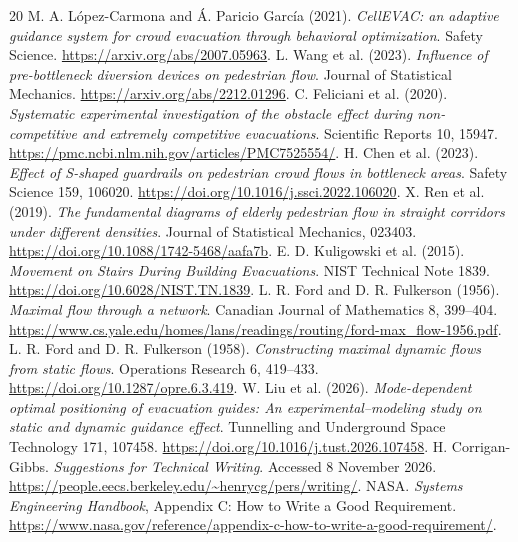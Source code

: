 \documentclass[11pt,a4paper]{article}
\begin{document}
\begin{thebibliography}{20}
 M. A. L\'opez-Carmona and \'A. Paricio Garc\'ia (2021). \emph{CellEVAC: an adaptive guidance system for crowd evacuation through behavioral optimization}. Safety Science. \url{https://arxiv.org/abs/2007.05963}.
 L. Wang et al. (2023). \emph{Influence of pre-bottleneck diversion devices on pedestrian flow}. Journal of Statistical Mechanics. \url{https://arxiv.org/abs/2212.01296}.
 C. Feliciani et al. (2020). \emph{Systematic experimental investigation of the obstacle effect during non-competitive and extremely competitive evacuations}. Scientific Reports 10, 15947. \url{https://pmc.ncbi.nlm.nih.gov/articles/PMC7525554/}.
 H. Chen et al. (2023). \emph{Effect of S-shaped guardrails on pedestrian crowd flows in bottleneck areas}. Safety Science 159, 106020. \url{https://doi.org/10.1016/j.ssci.2022.106020}.
 X. Ren et al. (2019). \emph{The fundamental diagrams of elderly pedestrian flow in straight corridors under different densities}. Journal of Statistical Mechanics, 023403. \url{https://doi.org/10.1088/1742-5468/aafa7b}.
 E. D. Kuligowski et al. (2015). \emph{Movement on Stairs During Building Evacuations}. NIST Technical Note 1839. \url{https://doi.org/10.6028/NIST.TN.1839}.
 L. R. Ford and D. R. Fulkerson (1956). \emph{Maximal flow through a network}. Canadian Journal of Mathematics 8, 399--404. \url{https://www.cs.yale.edu/homes/lans/readings/routing/ford-max_flow-1956.pdf}.
 L. R. Ford and D. R. Fulkerson (1958). \emph{Constructing maximal dynamic flows from static flows}. Operations Research 6, 419--433. \url{https://doi.org/10.1287/opre.6.3.419}.
 W. Liu et al. (2026). \emph{Mode-dependent optimal positioning of evacuation guides: An experimental--modeling study on static and dynamic guidance effect}. Tunnelling and Underground Space Technology 171, 107458. \url{https://doi.org/10.1016/j.tust.2026.107458}.
 H. Corrigan-Gibbs. \emph{Suggestions for Technical Writing}. Accessed 8 November 2026. \url{https://people.eecs.berkeley.edu/~henrycg/pers/writing/}.
 NASA. \emph{Systems Engineering Handbook}, Appendix C: How to Write a Good Requirement. \url{https://www.nasa.gov/reference/appendix-c-how-to-write-a-good-requirement/}.
\end{thebibliography}
\end{document}
